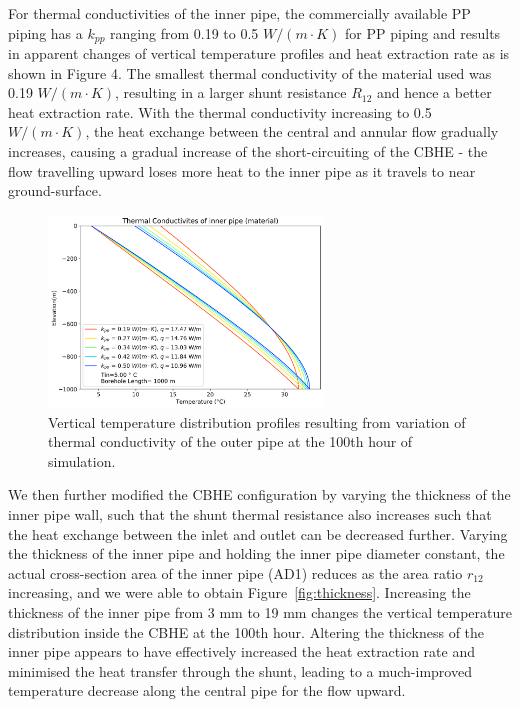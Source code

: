 		For thermal conductivities of the inner pipe, the commercially available PP piping has a $k_{pp}$ ranging from 0.19 to 0.5 $W/(m \cdot K)$ for PP piping and results in apparent changes of vertical temperature profiles and heat extraction rate as is shown in Figure 4. The smallest thermal conductivity of the material used was 0.19 $W/(m \cdot K)$, resulting in a larger shunt resistance $R_{12}$ and hence a better heat extraction rate. With the thermal conductivity increasing to 0.5 $W/(m \cdot K)$, the heat exchange between the central and annular flow gradually increases, causing a gradual increase of the short-circuiting of the CBHE - the flow travelling upward loses more heat to the inner pipe as it travels to near ground-surface. 
        
        \begin{figure}[h!]
            \centering
            \includegraphics[width=0.65\textwidth]{kpp_500_MIN.png}
            \caption{Vertical temperature distribution profiles resulting from variation of thermal conductivity of the outer pipe at the 100th hour of simulation.}
            \label{fig:kpp}
        \end{figure}
        
		We then further modified the CBHE configuration by varying the thickness of the inner pipe wall, such that the shunt thermal resistance also increases such that the heat exchange between the inlet and outlet can be decreased further. Varying the thickness of the inner pipe and holding the inner pipe diameter constant, the actual cross-section area of the inner pipe (AD1) reduces as the area ratio $r_{12}$ increasing, and we were able to obtain Figure~\ref{fig:thickness}. Increasing the thickness of the inner pipe from 3 mm to 19 mm changes the vertical temperature distribution inside the CBHE at the 100th hour. Altering the thickness of the inner pipe appears to have effectively increased the heat extraction rate and minimised the heat transfer through the shunt, leading to a much-improved temperature decrease along the central pipe for the flow upward.
         

